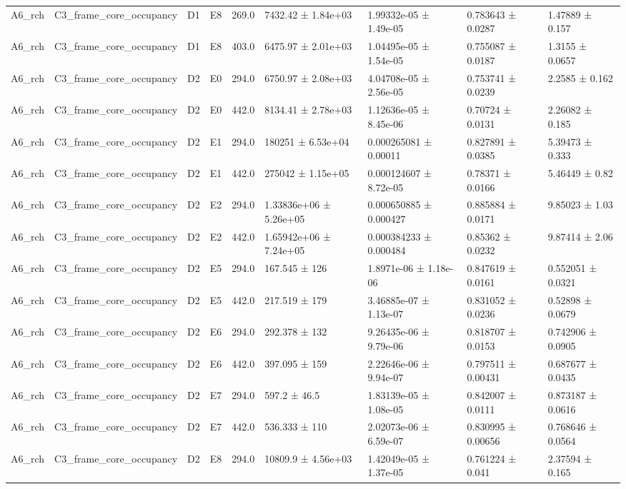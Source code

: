 \begin{table}
\begin{tabular}{lllllllll}
A6\_rch & C3\_frame\_core\_occupancy & D1 & E8 & 269.0 & 7432.42 ± 1.84e+03 & 1.99332e-05 ± 1.49e-05 & 0.783643 ± 0.0287 & 1.47889 ± 0.157 \\
A6\_rch & C3\_frame\_core\_occupancy & D1 & E8 & 403.0 & 6475.97 ± 2.01e+03 & 1.04495e-05 ± 1.54e-05 & 0.755087 ± 0.0187 & 1.3155 ± 0.0657 \\
A6\_rch & C3\_frame\_core\_occupancy & D2 & E0 & 294.0 & 6750.97 ± 2.08e+03 & 4.04708e-05 ± 2.56e-05 & 0.753741 ± 0.0239 & 2.2585 ± 0.162 \\
A6\_rch & C3\_frame\_core\_occupancy & D2 & E0 & 442.0 & 8134.41 ± 2.78e+03 & 1.12636e-05 ± 8.45e-06 & 0.70724 ± 0.0131 & 2.26082 ± 0.185 \\
A6\_rch & C3\_frame\_core\_occupancy & D2 & E1 & 294.0 & 180251 ± 6.53e+04 & 0.000265081 ± 0.00011 & 0.827891 ± 0.0385 & 5.39473 ± 0.333 \\
A6\_rch & C3\_frame\_core\_occupancy & D2 & E1 & 442.0 & 275042 ± 1.15e+05 & 0.000124607 ± 8.72e-05 & 0.78371 ± 0.0166 & 5.46449 ± 0.82 \\
A6\_rch & C3\_frame\_core\_occupancy & D2 & E2 & 294.0 & 1.33836e+06 ± 5.26e+05 & 0.000650885 ± 0.000427 & 0.885884 ± 0.0171 & 9.85023 ± 1.03 \\
A6\_rch & C3\_frame\_core\_occupancy & D2 & E2 & 442.0 & 1.65942e+06 ± 7.24e+05 & 0.000384233 ± 0.000484 & 0.85362 ± 0.0232 & 9.87414 ± 2.06 \\
A6\_rch & C3\_frame\_core\_occupancy & D2 & E5 & 294.0 & 167.545 ± 126 & 1.8971e-06 ± 1.18e-06 & 0.847619 ± 0.0161 & 0.552051 ± 0.0321 \\
A6\_rch & C3\_frame\_core\_occupancy & D2 & E5 & 442.0 & 217.519 ± 179 & 3.46885e-07 ± 1.13e-07 & 0.831052 ± 0.0236 & 0.52898 ± 0.0679 \\
A6\_rch & C3\_frame\_core\_occupancy & D2 & E6 & 294.0 & 292.378 ± 132 & 9.26435e-06 ± 9.79e-06 & 0.818707 ± 0.0153 & 0.742906 ± 0.0905 \\
A6\_rch & C3\_frame\_core\_occupancy & D2 & E6 & 442.0 & 397.095 ± 159 & 2.22646e-06 ± 9.94e-07 & 0.797511 ± 0.00431 & 0.687677 ± 0.0435 \\
A6\_rch & C3\_frame\_core\_occupancy & D2 & E7 & 294.0 & 597.2 ± 46.5 & 1.83139e-05 ± 1.08e-05 & 0.842007 ± 0.0111 & 0.873187 ± 0.0616 \\
A6\_rch & C3\_frame\_core\_occupancy & D2 & E7 & 442.0 & 536.333 ± 110 & 2.02073e-06 ± 6.59e-07 & 0.830995 ± 0.00656 & 0.768646 ± 0.0564 \\
A6\_rch & C3\_frame\_core\_occupancy & D2 & E8 & 294.0 & 10809.9 ± 4.56e+03 & 1.42049e-05 ± 1.37e-05 & 0.761224 ± 0.041 & 2.37594 ± 0.165 \\

\end{tabular}
\end{table}
